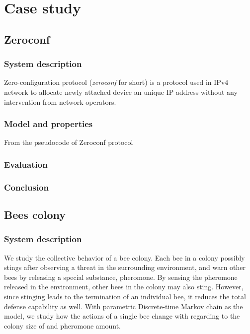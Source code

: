 \chapter{Case study}
\section{Zeroconf}
\subsection{System description}
Zero-configuration protocol (\textit{zeroconf} for short) is a protocol used in IPv4 network to
allocate newly attached device an unique IP address without any intervention from network operators.

\subsection{Model and properties}
From the pseudocode of Zeroconf protocol
\subsection{Evaluation}
\subsection{Conclusion}

\section{Bees colony}
\subsection{System description}
We study the collective behavior of a bee colony. Each bee in a colony possibly stings after
observing a threat in the surrounding environment, and warn other bees by releasing a special
substance, pheromone. By sensing the pheromone released in the environment, other bees in the colony
may also sting. However, since stinging leads to the termination of an individual bee, it reduces
the total defense capability as well. With parametric Discrete-time Markov chain as the model, we
study how the actions of a single bee change with regarding to the colony size of and pheromone
amount.

